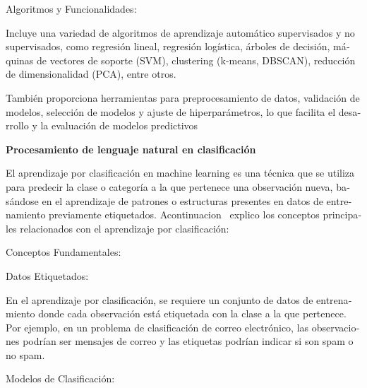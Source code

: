 \documentclass[letterpaper]{article}
\begin{document}
{
\foreignlanguage{spanish}{Algoritmos y Funcionalidades:}}

{
\foreignlanguage{spanish}{Incluye una variedad de algoritmos de aprendizaje automático supervisados y no supervisados,
como regresión lineal, regresión logística, árboles de decisión, máquinas de vectores de soporte (SVM), clustering
(k-means, DBSCAN), reducción de dimensionalidad (PCA), entre otros.}}

{
\foreignlanguage{spanish}{También proporciona herramientas para preprocesamiento de datos, validación de modelos,
selección de modelos y ajuste de hiperparámetros, lo que facilita el desarrollo y la evaluación de modelos
predictivos}}


\bigskip


\bigskip


\bigskip


\bigskip


\bigskip


\bigskip


\bigskip


\bigskip

{
\bigskip
\bigskip
\textbf{Procesamiento de lenguaje natural en clasificación}}

{
\foreignlanguage{spanish}{El aprendizaje por clasificación en machine learning es una técnica que se utiliza para
predecir la clase o categoría a la que pertenece una observación nueva, basándose en el aprendizaje de patrones o
estructuras presentes en datos de entrenamiento previamente etiquetados. Acontinuacion \ explico los conceptos
principales relacionados con el aprendizaje por clasificación:}}

{
\foreignlanguage{spanish}{Conceptos Fundamentales:}}

{
\foreignlanguage{spanish}{Datos Etiquetados:}}

{
\foreignlanguage{spanish}{En el aprendizaje por clasificación, se requiere un conjunto de datos de entrenamiento donde
cada observación está etiquetada con la clase a la que pertenece. Por ejemplo, en un problema de clasificación de
correo electrónico, las observaciones podrían ser mensajes de correo y las etiquetas podrían indicar si son
{\textquotedbl}spam{\textquotedbl} o {\textquotedbl}no spam{\textquotedbl}.}}

{
\foreignlanguage{spanish}{Modelos de Clasificación:}}
\end{document}
